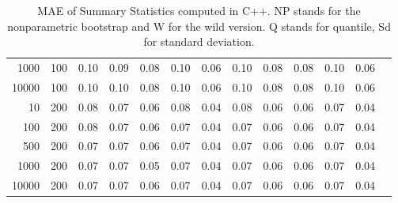 \begin{table}[ht]
\begin{tabular}{rrrrrrrrrrrrr}
  1000 & 100 & 0.10 & 0.09 & 0.08 & 0.10 & 0.06 & 0.10 & 0.08 & 0.08 & 0.10 & 0.06 \\ 
  10000 & 100 & 0.10 & 0.10 & 0.08 & 0.10 & 0.06 & 0.10 & 0.08 & 0.08 & 0.10 & 0.06 \\ 
  10 & 200 & 0.08 & 0.07 & 0.06 & 0.08 & 0.04 & 0.08 & 0.06 & 0.06 & 0.07 & 0.04 \\ 
  100 & 200 & 0.08 & 0.07 & 0.06 & 0.07 & 0.04 & 0.07 & 0.06 & 0.06 & 0.07 & 0.04 \\ 
  500 & 200 & 0.07 & 0.07 & 0.06 & 0.07 & 0.04 & 0.07 & 0.06 & 0.06 & 0.07 & 0.04 \\ 
  1000 & 200 & 0.07 & 0.07 & 0.05 & 0.07 & 0.04 & 0.07 & 0.06 & 0.06 & 0.07 & 0.04 \\ 
  10000 & 200 & 0.07 & 0.07 & 0.06 & 0.07 & 0.04 & 0.07 & 0.06 & 0.06 & 0.07 & 0.04 \\ 
   \hline
\end{tabular}
\caption[MAE of Summary Statistics C++]{MAE of Summary Statistics computed in C++. NP stands for the nonparametric bootstrap and W for the wild version. Q stands for quantile, Sd for standard deviation.}
\label{tab:sum_mae_cpp}
\end{table}

